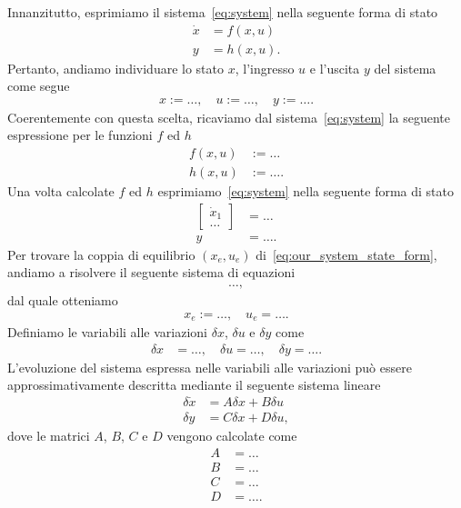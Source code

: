 \documentclass[a4paper, 11pt]{article}
\begin{document}
Innanzitutto, esprimiamo il sistema~\eqref{eq:system} nella seguente forma di stato
%
\begin{subequations}
\begin{align}\label{eq:state_form}
	\dot{x} &= f(x,u)
	\\
	y &= h(x,u).
\end{align}
\end{subequations}
%
Pertanto, andiamo individuare lo stato $x$, l'ingresso $u$ e l'uscita $y$ del sistema come segue 
%
\begin{align*}
	x := \dots, \quad u := \dots, \quad y := \dots.
\end{align*}
%
Coerentemente con questa scelta, ricaviamo dal sistema~\eqref{eq:system} la seguente espressione per le funzioni $f$ ed $h$
%
\begin{align*}
	f(x,u) &:= \dots
	\\
	h(x,u) &:= \dots.
\end{align*}
%
Una volta calcolate $f$ ed $h$ esprimiamo~\eqref{eq:system} nella seguente forma di stato
%
\begin{subequations}\label{eq:our_system_state_form}
\begin{align}
	\begin{bmatrix}
		\dot{x}_1
		\\
		\dots
	\end{bmatrix} &= \dots \label{eq:state_form_1}
	\\
	y &= \dots.
\end{align}
\end{subequations}
%
Per trovare la coppia di equilibrio $(x_e, u_e)$ di~\eqref{eq:our_system_state_form}, andiamo a risolvere il seguente sistema di equazioni
%
\begin{align}
	\dots,
\end{align}
%
dal quale otteniamo
%
\begin{align}
	x_e := \dots,  \quad u_e = \dots.\label{eq:equilibirum_pair}
\end{align}
%
Definiamo le variabili alle variazioni $\delta x$, $\delta u$ e $\delta y$ come 
%
\begin{align*}
	\delta x &= \dots, 
	\quad
	\delta u = \dots, 
	\quad
	\delta y = \dots.
\end{align*}
%
L'evoluzione del sistema espressa nelle variabili alle variazioni pu\`o essere approssimativamente descritta mediante il seguente sistema lineare
%
\begin{subequations}\label{eq:linearized_system}
\begin{align}
	\delta \dot{x} &= A\delta x + B\delta u
	\\
	\delta y &= C\delta x + D\delta u,
\end{align}
\end{subequations}
%
dove le matrici $A$, $B$, $C$ e $D$ vengono calcolate come
%
\begin{subequations}\label{eq:matrices}
\begin{align}
	A &= \dots
	\\
	B &= \dots
	\\
	C &= \dots
	\\
	D &= \dots.
\end{align}
\end{subequations}
%
\end{document}
